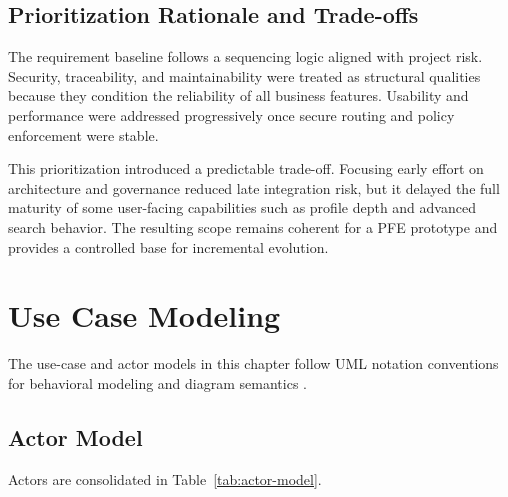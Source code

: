 \subsection{Prioritization Rationale and Trade-offs}

The requirement baseline follows a sequencing logic aligned with project risk.
Security, traceability, and maintainability were treated as structural
qualities because they condition the reliability of all business features.
Usability and performance were addressed progressively once secure routing and
policy enforcement were stable.

This prioritization introduced a predictable trade-off. Focusing early effort
on architecture and governance reduced late integration risk, but it delayed
the full maturity of some user-facing capabilities such as profile depth and
advanced search behavior. The resulting scope remains coherent for a PFE
prototype and provides a controlled base for incremental evolution.

\section{Use Case Modeling}

The use-case and actor models in this chapter follow UML notation conventions
for behavioral modeling and diagram semantics \cite{uml-spec}.

\subsection{Actor Model}

Actors are consolidated in Table~\ref{tab:actor-model}.

